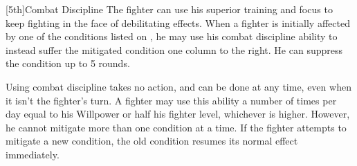         [5th]{Combat Discipline}
        The fighter can use his superior training and focus to keep fighting in the face of debilitating effects.
        When a fighter is initially affected by one of the conditions listed on , he may use his combat discipline ability to instead suffer the mitigated condition one column to the right.
        He can suppress the condition up to 5 rounds.

        \par Using combat discipline takes no action, and can be done at any time, even when it isn't the fighter's turn.
        A fighter may use this ability a number of times per day equal to his Willpower or half his fighter level, whichever is higher.
        However, he cannot mitigate more than one condition at a time.
        If the fighter attempts to mitigate a new condition, the old condition resumes its normal effect immediately.

